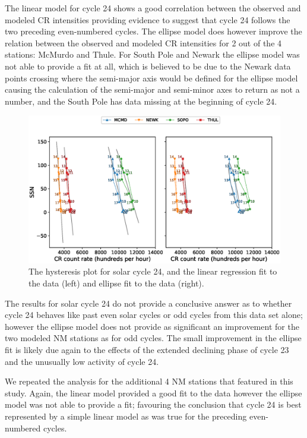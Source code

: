 The linear model for cycle 24 shows a good correlation between the observed and modeled CR intensities providing evidence to suggest that cycle 24 follows the two preceding even-numbered cycles. The ellipse model does however improve the relation between the observed and modeled CR intensities for 2 out of the 4 stations: McMurdo and Thule. For South Pole and Newark the ellipse model was not able to provide a fit at all, which is believed to be due to the Newark data points crossing where the semi-major axis would be defined for the ellipse model causing the calculation of the semi-major and semi-minor axes to return as not a number, and the South Pole has data missing at the beginning of cycle 24.

\begin{figure}
	\includegraphics[width=\columnwidth]{24.eps}
	\caption{The hysteresis plot for solar cycle 24, and the linear regression fit to the data (left) and ellipse fit to the data (right).}
	\label{fig:24}
\end{figure}

The results for solar cycle 24 do not provide a conclusive answer as to whether cycle 24 behaves like past even solar cycles or odd cycles from this data set alone; however the ellipse model does not provide as significant an improvement for the two modeled NM stations as for odd cycles. The small improvement in the ellipse fit is likely due again to the effects of the extended declining phase of cycle 23 and the unusually low activity of cycle 24.

We repeated the analysis for the additional 4 NM stations that featured in this study. Again, the linear model provided a good fit to the data however the ellipse model was not able to provide a fit; favouring the conclusion that cycle 24 is best represented by a simple linear model as was true for the preceding even-numbered cycles.

